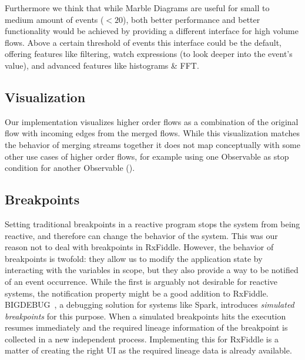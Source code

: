 Furthermore we think that while Marble Diagrams are useful for small to medium amount of events ($< 20$), both better performance and better functionality would be achieved by providing a different interface for high volume flows. Above a certain threshold of events this interface could be the default, offering features like filtering, watch expressions (to look deeper into the event's value), and advanced features like histograms \& FFT.

\subsection{Visualization}
Our implementation visualizes higher order flows as a combination of the original flow with incoming edges from the merged flows. While this visualization matches the behavior of merging streams together it does not map conceptually with some other use cases of higher order flows, for example using one Observable as stop condition for another Observable ().

\subsection{Breakpoints}
Setting traditional breakpoints in a reactive program stops the system from being reactive, and therefore can change the behavior of the system. This was our reason not to deal with breakpoints in RxFiddle. However, the behavior of breakpoints is twofold: they allow us to modify the application state by interacting with the variables in scope, but they also provide a way to be notified of an event occurrence. While the first is arguably not desirable for reactive systems, the notification property might be a good addition to RxFiddle. BIGDEBUG~\cite{Gulzar2016}, a debugging solution for systems like Spark, introduces \textit{simulated breakpoints} for this purpose. When a simulated breakpoints hits the execution resumes immediately and the required lineage information of the breakpoint is collected in a new independent process. Implementing this for RxFiddle is a matter of creating the right UI as the required lineage data is already available.

